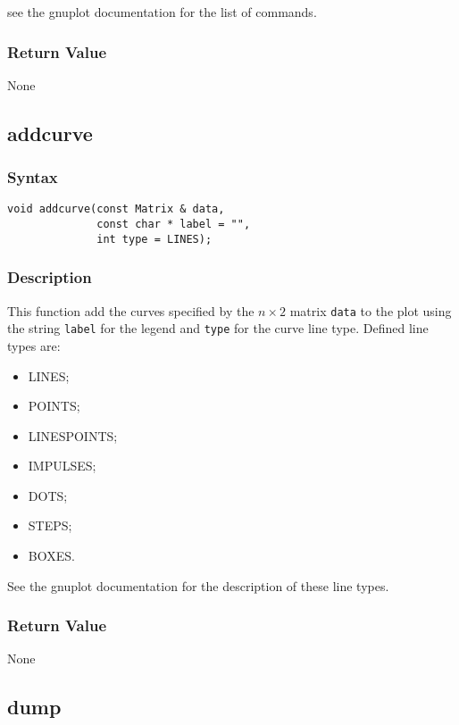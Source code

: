 \documentclass[dvips,11pt,fleqn]{report}
\begin{document}
 see the \textsf{gnuplot} documentation for the list
of commands.

\subsubsection*{Return Value}

None 

\newpage

\subsection*{addcurve}
\subsubsection*{Syntax}
\begin{verbatim}
void addcurve(const Matrix & data, 
              const char * label = "", 
              int type = LINES);
\end{verbatim}
\subsubsection*{Description}
This function add the curves specified by the $n \times 2$ matrix
{\tt data} to the plot using the string {\tt label} for the legend
and {\tt type} for the curve line type. Defined line types are:
\begin{itemize}
\item LINES;
\item POINTS;
\item LINESPOINTS;
\item IMPULSES;
\item DOTS;
\item STEPS;
\item BOXES.
\end{itemize}
See the \textsf{gnuplot} documentation for the description of these line
types.


\subsubsection*{Return Value}

None

\newpage

\subsection*{dump}
\end{document}
